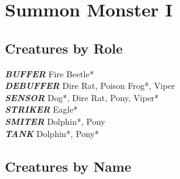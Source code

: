 \newpage

\def \levelnnumsummons{1}

\chapter{Summon Monster I}
\newpage

\section{Creatures by Role}

\vspace{5pt}

\textbf{\textit{BUFFER}} Fire Beetle* \\

\textbf{\textit{DEBUFFER}} Dire Rat, Poison Frog*, Viper \\

\textbf{\textit{SENSOR}} Dog*, Dire Rat, Pony, Viper* \\

\textbf{\textit{STRIKER}} Eagle* \\

\textbf{\textit{SMITER}} Dolphin*, Pony \\

\textbf{\textit{TANK}} Dolphin*, Pony* \\


\newpage

\section{Creatures by Name} 









